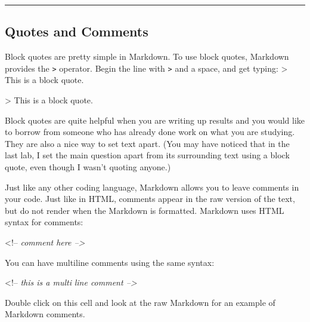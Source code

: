 \documentclass[11pt]{article}
\newenvironment{Shaded}{}{}
\newcommand{\DataTypeTok}[1]{\textcolor[rgb]{0.56,0.13,0.00}{{#1}}}
\newcommand{\CommentTok}[1]{\textcolor[rgb]{0.38,0.63,0.69}{\textit{{#1}}}}
\newcommand{\NormalTok}[1]{{#1}}
\begin{document}
\begin{center}\rule{0.5\linewidth}{\linethickness}\end{center}

    \hypertarget{quotes}{}

\hypertarget{quotes-and-comments}{%
\subsection{Quotes and Comments}\label{quotes-and-comments}}

Block quotes are pretty simple in Markdown. To use block quotes,
Markdown provides the \texttt{\textgreater{}} operator. Begin the line
with \texttt{\textgreater{}} and a space, and get typing: \textgreater{}
This is a block quote.

\begin{Shaded}
\begin{Highlighting}[]
\NormalTok{>}\DataTypeTok{ This is a block quote.}
\end{Highlighting}
\end{Shaded}

Block quotes are quite helpful when you are writing up results and you
would like to borrow from someone who has already done work on what you
are studying. They are also a nice way to set text apart. (You may have
noticed that in the last lab, I set the main question apart from its
surrounding text using a block quote, even though I wasn't quoting
anyone.)

Just like any other coding language, Markdown allows you to leave
comments in your code. Just like in HTML, comments appear in the raw
version of the text, but do not render when the Markdown is formatted.
Markdown uses HTML syntax for comments:

\begin{Shaded}
\begin{Highlighting}[]
\NormalTok{<!--}\CommentTok{ comment here -->}
\end{Highlighting}
\end{Shaded}

You can have multiline comments using the same syntax:

\begin{Shaded}
\begin{Highlighting}[]
\NormalTok{<!--}\CommentTok{ this is a multi}
\CommentTok{line comment -->}
\end{Highlighting}
\end{Shaded}

Double click on this cell and look at the raw Markdown for an example of
Markdown comments. 
\end{document}
